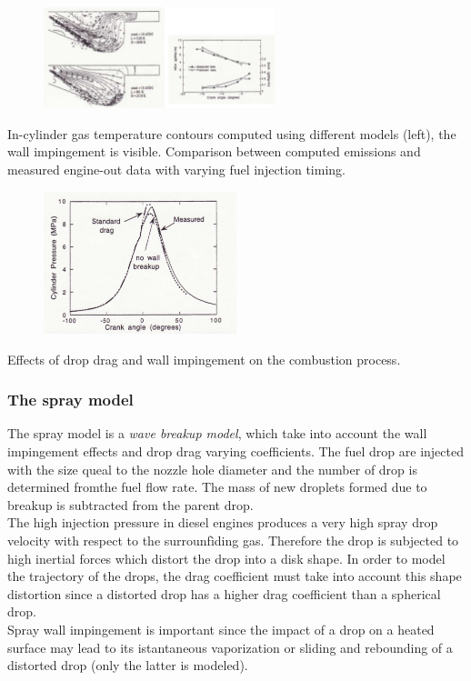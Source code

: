 \documentclass[12pt]{article}
\begin{document}
\begin{figure}[h!]
\centering
\includegraphics[width=0.6\textwidth]{figures/kiva2.png}
\end{figure}

In-cylinder gas temperature contours computed using different models (left), the wall impingement is visible. Comparison between computed emissions and measured engine-out data with varying fuel injection timing.

\begin{figure}[h!]
\centering
\includegraphics[width=0.5\textwidth]{figures/kiva3.png}
\end{figure}

Effects of drop drag and wall impingement on the combustion process.

\subsubsection{The spray model}

The spray model is a \textit{wave breakup model}, which take into account the wall impingement effects and drop drag varying coefficients. The fuel drop are injected with the size queal to the nozzle hole diameter and the number of drop is determined fromthe fuel flow rate. The mass of new droplets formed due to breakup is subtracted from the parent drop.\\
The high injection pressure in diesel engines produces a very high spray drop velocity with respect to the surrounfìding gas. Therefore the drop is subjected to high inertial forces which distort the drop into a disk shape. In order to model the trajectory of the drops, the drag coefficient must take into account this shape distortion since a distorted drop has a higher drag coefficient than a spherical drop.\\
Spray wall impingement is important since the impact of a drop on a heated surface may lead to its istantaneous vaporization or sliding and rebounding of a distorted drop (only the latter is modeled).
\end{document}

